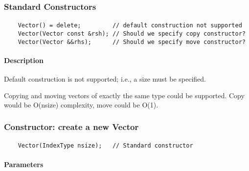 {


\subsubsection{Standard Constructors}

\paragraph{\syntax}

\begin{verbatim}
    Vector() = delete;         // default construction not supported
    Vector(Vector const &rsh); // Should we specify copy constructor?
    Vector(Vector &&rhs);      // Should we specify move constructor?
\end{verbatim}

\paragraph{Description}


Default construction is not supported; i.e., a size must be specified.

Copying and moving vectors of exactly the same type could be supported.  
Copy would be O(nsize) complexity, move could be O(1).


\subsubsection{Constructor: create a new Vector}

\paragraph{\syntax}

\begin{verbatim}
    Vector(IndexType nsize);   // Standard constructor
\end{verbatim}

\paragraph{Parameters}

}
